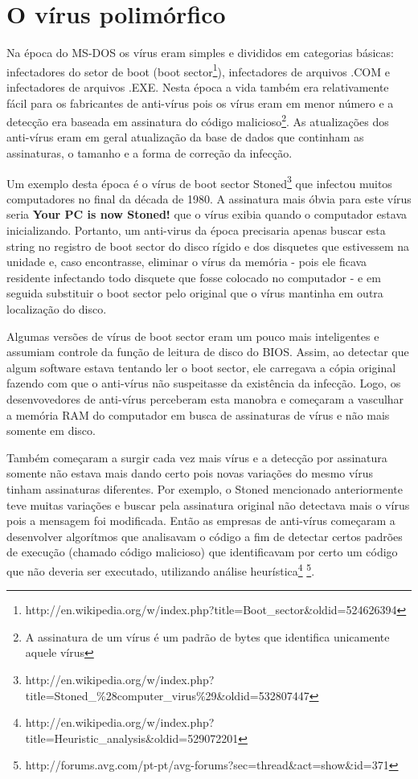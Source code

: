 \chapter{O vírus polimórfico}

Na época do MS-DOS os vírus eram simples e divididos em categorias básicas: infectadores do setor de boot (boot sector\footnote{http://en.wikipedia.org/w/index.php?title=Boot\_sector\&oldid=524626394}), infectadores de arquivos .COM e infectadores de arquivos .EXE. Nesta época a vida também era relativamente fácil para os fabricantes de anti-vírus pois os vírus eram em menor número e a detecção era baseada em assinatura do código malicioso\footnote{A assinatura de um vírus é um padrão de bytes que identifica unicamente aquele vírus}. As atualizações dos anti-vírus eram em geral atualização da base de dados que continham as assinaturas, o tamanho e a forma de correção da infecção.

Um exemplo desta época é o vírus de boot sector Stoned\footnote{http://en.wikipedia.org/w/index.php?title=Stoned\_\%28computer\_virus\%29\&oldid=532807447} que infectou muitos computadores no final da década de 1980. A assinatura mais óbvia para este vírus seria \textbf{Your PC is now Stoned!} que o vírus exibia quando o computador estava inicializando. Portanto, um anti-virus da época precisaria apenas buscar esta string no registro de boot sector do disco rígido e dos disquetes que estivessem na unidade e, caso encontrasse, eliminar o vírus da memória - pois ele ficava residente infectando todo disquete que fosse colocado no computador - e em seguida substituir o boot sector pelo original que o vírus mantinha em outra localização do disco.

Algumas versões de vírus de boot sector eram um pouco mais inteligentes e assumiam controle da função de leitura de disco do BIOS. Assim, ao detectar que algum software estava tentando ler o boot sector, ele carregava a cópia original fazendo com que o anti-vírus não suspeitasse da existência da infecção. Logo, os desenvovedores de anti-vírus perceberam esta manobra e começaram a vasculhar a memória RAM do computador em busca de assinaturas de vírus e não mais somente em disco.

Também começaram a surgir cada vez mais vírus e a detecção por assinatura somente não estava mais dando certo pois novas variações do mesmo vírus tinham assinaturas diferentes. Por exemplo, o Stoned mencionado anteriormente teve muitas variações e buscar pela assinatura original não detectava mais o vírus pois a mensagem foi modificada. Então as empresas de anti-vírus começaram a desenvolver algorítmos que analisavam o código a fim de detectar certos padrões de execução (chamado código malicioso) que identificavam por certo um código que não deveria ser executado, utilizando análise heurística\footnote{http://en.wikipedia.org/w/index.php?title=Heuristic\_analysis\&oldid=529072201} \footnote{http://forums.avg.com/pt-pt/avg-forums?sec=thread\&act=show\&id=371}.

